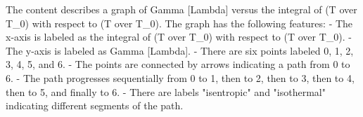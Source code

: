 The content describes a graph of Gamma [Lambda] versus the integral of (T over T_0) with respect to (T over T_0). The graph has the following features:
- The x-axis is labeled as the integral of (T over T_0) with respect to (T over T_0).
- The y-axis is labeled as Gamma [Lambda].
- There are six points labeled 0, 1, 2, 3, 4, 5, and 6.
- The points are connected by arrows indicating a path from 0 to 6.
- The path progresses sequentially from 0 to 1, then to 2, then to 3, then to 4, then to 5, and finally to 6.
- There are labels "isentropic" and "isothermal" indicating different segments of the path.